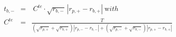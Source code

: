


\begin{eqnarray*}
  t_{b,-} & = & \ C^{te} \cdot \sqrt{r_{b,-}}\,\left| r_{p,+} - r_{b,+} \right|
                \ {\mathrm with}
\\
   C^{te} & = & \frac{T}
                 {\left( \sqrt{r_{p,+}} + \sqrt{r_{b,+}} \right)
                  \left| r_{p,-} - r_{b,-} \right| + 
                  \left( \sqrt{r_{p,-}} + \sqrt{r_{b,-}} \right)
                  \left| r_{p,+} - r_{b,+} \right|}
\end{eqnarray*}

